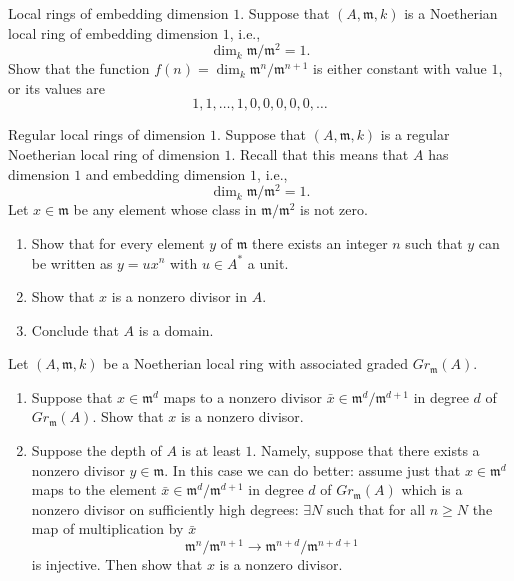 \begin{exercise}
Local rings of embedding dimension $1$.
Suppose that $(A,{\mathfrak m},k)$ is a Noetherian local ring
of embedding dimension $1$, i.e.,
$$
\dim_k {\mathfrak m}/{\mathfrak m}^2 = 1.
$$
Show that the function $f(n) = \dim_k {\mathfrak m}^n/{\mathfrak m}^{n+1}$
is either constant with value $1$, or its values are
$$
1,1,\ldots,1,0,0,0,0,0,\ldots
$$
\end{exercise}

\begin{exercise}
Regular local rings of dimension $1$.
Suppose that $(A,{\mathfrak m},k)$ is a regular Noetherian local ring of
dimension $1$. Recall that this means that $A$ has dimension $1$
and embedding dimension $1$, i.e.,
$$
\dim_k {\mathfrak m}/{\mathfrak m}^2 = 1.
$$
Let $x\in{\mathfrak m}$ be any element whose class in ${\mathfrak m}/{\mathfrak m}^2$ is not zero.
\begin{enumerate}
\item Show that for every element $y$
of ${\mathfrak m}$ there exists an integer $n$ such that $y$ can be written as
$y=ux^n$ with $u\in A^\ast$ a unit.
\item Show that $x$ is a nonzero divisor in $A$.
\item Conclude that $A$ is a domain.
\end{enumerate}
\end{exercise}

\begin{exercise}
Let $(A,{\mathfrak m},k)$ be a Noetherian local ring with associated
graded $Gr_{\mathfrak m}(A)$.
\begin{enumerate}
\item Suppose that $x\in {\mathfrak m}^d$ maps to a nonzero
divisor $\bar x \in {\mathfrak m}^d/{\mathfrak m}^{d+1}$ in degree $d$ of $Gr_{\mathfrak m}(A)$.
Show that $x$ is a nonzero divisor.
\item Suppose the depth of $A$ is at least $1$.
Namely, suppose that there exists a nonzero divisor $y \in {\mathfrak m}$.
In this case we can do better: assume just that $x\in {\mathfrak m}^d$ maps to
the element $\bar x \in {\mathfrak m}^d/{\mathfrak m}^{d+1}$ in degree $d$
of $Gr_{\mathfrak m}(A)$ which is a nonzero divisor on sufficiently
high degrees: $\exists N$ such that for all $n \geq N$ the map
of multiplication by $\bar x$ 
$$
{\mathfrak m}^n/{\mathfrak m}^{n+1} \longrightarrow
{\mathfrak m}^{n+d}/{\mathfrak m}^{n+d+1}
$$
is injective. Then show that $x$ is a nonzero divisor.
\end{enumerate}
\end{exercise}


